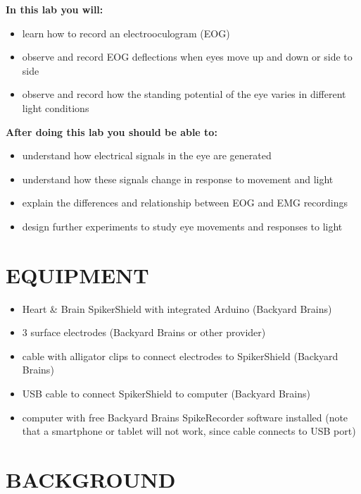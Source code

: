 \documentclass[12pt]{article}
\begin{document}
\vspace{0.3cm}

\textbf{In this lab you will:}
\begin{itemize}
\item learn how to record an electrooculogram (EOG) 
\item observe and record EOG deflections when eyes move up and down or side to side
\item observe and record how the standing potential of the eye varies in different light conditions 
\end{itemize}

\vspace{0.3cm}
 
\textbf{After doing this lab you should be able to:}
\begin{itemize}
\item understand how electrical signals in the eye are generated
\item understand how these signals change in response to movement and light
\item explain the differences and relationship between EOG and EMG recordings
\item design further experiments to study eye movements and responses to light
\end{itemize}

\section*{EQUIPMENT}

\begin{itemize}
	\item Heart \& Brain SpikerShield with integrated Arduino (Backyard Brains)
   	\item 3 surface electrodes (Backyard Brains or other provider)
    \item cable with alligator clips to connect electrodes to SpikerShield (Backyard Brains)
    \item USB cable to connect SpikerShield to computer (Backyard Brains)
    \item computer with free Backyard Brains SpikeRecorder software installed (note that a smartphone or tablet will not work, since cable connects to USB port)
\end{itemize}

\section*{BACKGROUND}
\end{document}
